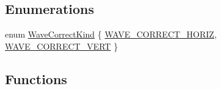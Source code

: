 \subsection*{Enumerations}
\begin{DoxyCompactItemize}
\item 
enum \hyperlink{namespacecv_1_1detail_a83b24d4c3e93584986a56d9e43b9cf7f}{Wave\-Correct\-Kind} \{ \hyperlink{namespacecv_1_1detail_a83b24d4c3e93584986a56d9e43b9cf7faa9e3a58207a58e3245aab95af18b68a9}{W\-A\-V\-E\-\_\-\-C\-O\-R\-R\-E\-C\-T\-\_\-\-H\-O\-R\-I\-Z}, 
\hyperlink{namespacecv_1_1detail_a83b24d4c3e93584986a56d9e43b9cf7fa3d3661394e07da0c7c51ddeb84851212}{W\-A\-V\-E\-\_\-\-C\-O\-R\-R\-E\-C\-T\-\_\-\-V\-E\-R\-T}
 \}
\end{DoxyCompactItemize}
\subsection*{Functions}
